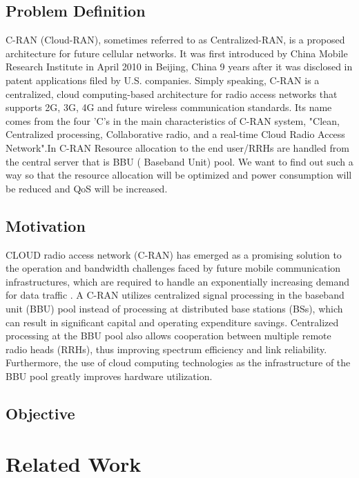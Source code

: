 \documentclass[paper=a4paper,12pt]{article}
\begin{document}
\subsection{Problem Definition}
C-RAN (Cloud-RAN), sometimes referred to as Centralized-RAN, is a proposed architecture for future cellular networks. It was first introduced by China Mobile Research Institute in April 2010 in Beijing, China 9 years after it was disclosed in patent applications filed by U.S. companies. Simply speaking, C-RAN is a centralized, cloud computing-based architecture for radio access networks that supports 2G, 3G, 4G and future wireless communication standards. Its name comes from the four 'C's in the main characteristics of C-RAN system, "Clean, Centralized processing, Collaborative radio, and a real-time Cloud Radio Access Network".In C-RAN Resource allocation to the end user/RRHs are handled from the central server that is BBU ( Baseband Unit) pool. We want to find out such a way so that the resource allocation will be optimized and power consumption will be reduced and QoS will be increased.
\subsection{Motivation}
CLOUD radio access network (C-RAN) has emerged as a promising solution to the operation and bandwidth challenges faced by future mobile communication infrastructures, which are required to handle an exponentially increasing demand for data traffic . A C-RAN utilizes centralized signal processing in the baseband unit (BBU) pool instead of processing at distributed base stations (BSs), which can result in significant capital and operating expenditure savings. Centralized processing at the BBU pool also allows cooperation between multiple remote radio heads (RRHs), thus improving spectrum efficiency and link reliability. Furthermore, the use of cloud computing technologies as the infrastructure of the BBU pool greatly improves hardware utilization.
\subsection{Objective}
\section{Related Work}
\end{document}
